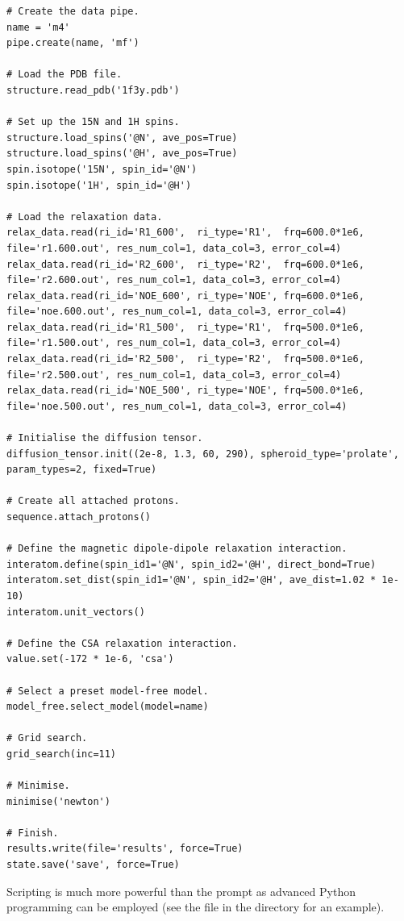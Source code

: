 \begin{lstlisting}
# Create the data pipe.
name = 'm4'
pipe.create(name, 'mf')

# Load the PDB file.
structure.read_pdb('1f3y.pdb')

# Set up the 15N and 1H spins.
structure.load_spins('@N', ave_pos=True)
structure.load_spins('@H', ave_pos=True)
spin.isotope('15N', spin_id='@N')
spin.isotope('1H', spin_id='@H')

# Load the relaxation data.
relax_data.read(ri_id='R1_600',  ri_type='R1',  frq=600.0*1e6, file='r1.600.out', res_num_col=1, data_col=3, error_col=4)
relax_data.read(ri_id='R2_600',  ri_type='R2',  frq=600.0*1e6, file='r2.600.out', res_num_col=1, data_col=3, error_col=4)
relax_data.read(ri_id='NOE_600', ri_type='NOE', frq=600.0*1e6, file='noe.600.out', res_num_col=1, data_col=3, error_col=4)
relax_data.read(ri_id='R1_500',  ri_type='R1',  frq=500.0*1e6, file='r1.500.out', res_num_col=1, data_col=3, error_col=4)
relax_data.read(ri_id='R2_500',  ri_type='R2',  frq=500.0*1e6, file='r2.500.out', res_num_col=1, data_col=3, error_col=4)
relax_data.read(ri_id='NOE_500', ri_type='NOE', frq=500.0*1e6, file='noe.500.out', res_num_col=1, data_col=3, error_col=4)

# Initialise the diffusion tensor.
diffusion_tensor.init((2e-8, 1.3, 60, 290), spheroid_type='prolate', param_types=2, fixed=True)

# Create all attached protons.
sequence.attach_protons()

# Define the magnetic dipole-dipole relaxation interaction.
interatom.define(spin_id1='@N', spin_id2='@H', direct_bond=True)
interatom.set_dist(spin_id1='@N', spin_id2='@H', ave_dist=1.02 * 1e-10)
interatom.unit_vectors()

# Define the CSA relaxation interaction.
value.set(-172 * 1e-6, 'csa')

# Select a preset model-free model.
model_free.select_model(model=name)

# Grid search.
grid_search(inc=11)

# Minimise.
minimise('newton')

# Finish.
results.write(file='results', force=True)
state.save('save', force=True)
\end{lstlisting}

Scripting is much more powerful than the prompt as advanced Python programming can be employed (see the file  in the  directory for an example).



